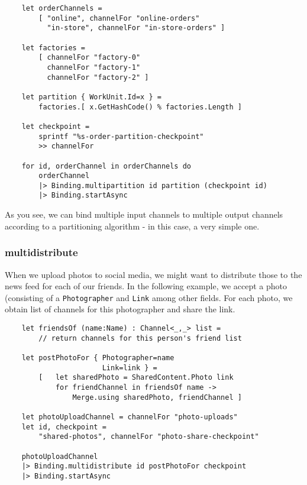 \documentclass{article}
\begin{document}
\begin{verbatim}
    let orderChannels =
        [ "online", channelFor "online-orders"
          "in-store", channelFor "in-store-orders" ]

    let factories =
        [ channelFor "factory-0"
          channelFor "factory-1"
          channelFor "factory-2" ]

    let partition { WorkUnit.Id=x } =
        factories.[ x.GetHashCode() % factories.Length ]
    
    let checkpoint =
        sprintf "%s-order-partition-checkpoint"
        >> channelFor

    for id, orderChannel in orderChannels do
        orderChannel
        |> Binding.multipartition id partition (checkpoint id)
        |> Binding.startAsync
\end{verbatim}

As you see, we can bind multiple input channels to multiple output channels according to a partitioning algorithm - in this case, a very simple one. 

\subsubsection{multidistribute}

When we upload photos to social media, we might want to distribute those to the news feed for each of our friends.  In the following example, we accept a photo (consisting of a \texttt{Photographer} and \texttt{Link} among other fields.  For each photo, we obtain list of channels for this photographer and share the link.

\begin{verbatim}
    let friendsOf (name:Name) : Channel<_,_> list =
        // return channels for this person's friend list

    let postPhotoFor { Photographer=name
                       Link=link } =
        [   let sharedPhoto = SharedContent.Photo link
            for friendChannel in friendsOf name ->
                Merge.using sharedPhoto, friendChannel ]

    let photoUploadChannel = channelFor "photo-uploads"
    let id, checkpoint =
        "shared-photos", channelFor "photo-share-checkpoint"
    
    photoUploadChannel
    |> Binding.multidistribute id postPhotoFor checkpoint
    |> Binding.startAsync
\end{verbatim}
\end{document}
